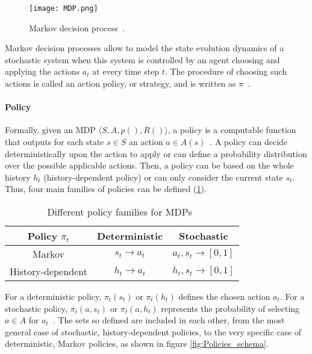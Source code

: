 \begin{figure}[h!]
	\centering
	\texttt{[image: MDP.png]}
	\caption{Markov decision process~\cite{Sigaud:2010:MDP:1841781}.}
	\label{fig:MDP}
\end{figure}

Markov decision processes allow to model the state evolution dynamics of a stochastic system when this system is controlled by an agent choosing and applying the actions $a_t$ at every time step $t$. The procedure of choosing such actions is called an action policy, or strategy, and is written as $\pi$~\cite{Sigaud:2010:MDP:1841781}.

\paragraph{Policy} Formally, given an MDP $\bigl\langle S, A, p(), R() \bigr\rangle$, a policy is a computable function that outputs for each state $s \in S$ an action $a \in A(s)$~\cite{wiering2012reinforcement}. A policy can decide deterministically upon the action to apply or can define a probability distribution over the possible applicable actions. Then, a policy can be based on the whole history $h_t$ (history-dependent policy) or can only consider the current state $s_t$. Thus, four main families of policies can be defined (\ref{table:T1}).

\begin{table}[h!]
\centering
\begin{tabular}{|c|c|c|}
	\hline \textbf{Policy $\pi_t$}
	&\textbf{Deterministic} & \textbf{Stochastic}  \\ 
	\hline
	\hline Markov 
	&$s_t \rightarrow a_t$  &$a_t, s_t \rightarrow [0, 1]$ \\ 
	 \hline History-dependent
	&$h_t \rightarrow a_t$  &$h_t, s_t \rightarrow [0,1]$  \\ 
	\hline
\end{tabular}
\caption{Different policy families for MDPs~\cite{Sigaud:2010:MDP:1841781}}
\label{table:T1}
\end{table} 

For a deterministic policy, $\pi_t (s_t)$ or $\pi_t (h_t)$ defines the chosen action $a_t$. For a stochastic policy, $\pi_t (a, s_t)$ or $\pi_t (a, h_t)$ represents the probability of selecting $a \in A$ for $a_t$~\cite{Sigaud:2010:MDP:1841781}. The sets so defined are included in each other, from the most general case of stochastic, history-dependent policies, to the very specific case of deterministic, Markov policies, as shown in figure \ref{fig:Policies_schema}.

